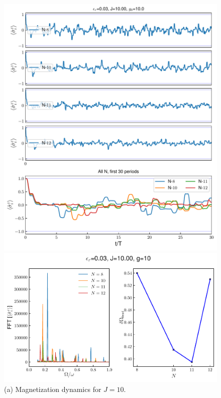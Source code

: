 \documentclass[a4paper, 11pt]{article}
\begin{document}
\begin{figure}[h!]
    \centering
    \begin{minipage}[t]{0.48\textwidth}     
        \centering
        \includegraphics[width=\textwidth]{time_mag_epsilon_r0.03_J10.00_g10.0_allN.pdf}
        \caption*{(a) Magnetization dynamics for $J = 10$.}
    \end{minipage}
    \hfill
    \begin{minipage}[t]{0.48\textwidth}
        \centering
        \includegraphics[width=\textwidth]{DTC_mag_fft_beat_er=0.03_J=10.0_g=10.0.pdf}

\end{minipage}
\end{figure}
\end{document}
